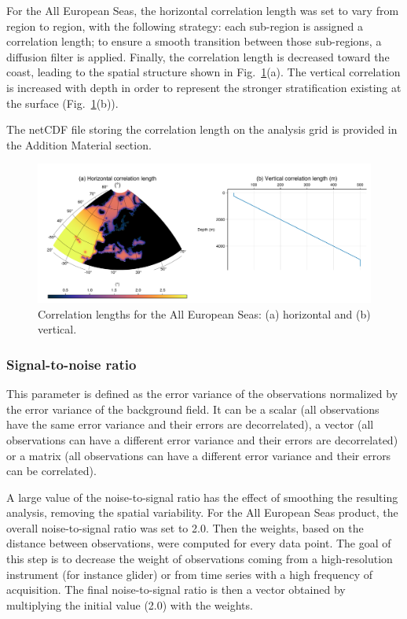 \documentclass[essd, manuscript]{copernicus}
\begin{document}
For the All European Seas, the horizontal correlation length was set to vary from region to region, with the following strategy: each sub-region is assigned a correlation length; to ensure a smooth transition between those sub-regions, a diffusion filter is applied. Finally, the correlation length is decreased toward the coast, leading to the spatial structure shown in Fig.~\ref{fig:correlation_length}(a). The vertical correlation is increased with depth in order to represent the stronger stratification existing at the surface (Fig.~\ref{fig:correlation_length}(b)).

The netCDF file storing the correlation length on the analysis grid is provided in the Addition Material section.

\begin{figure}[t]
\centering
\includegraphics[width=\textwidth]{correlation_length.pdf}
\caption{Correlation lengths for the All European Seas: (a) horizontal and (b) vertical.\label{fig:correlation_length}}
\end{figure}

\subsubsection{Signal-to-noise ratio}

This parameter is defined as the error variance of the observations normalized by the error variance of the background field. It can be a scalar (all observations have the same error variance and their errors are decorrelated), a vector (all observations can have a different error variance and their errors are decorrelated) or a matrix (all observations can have a different error variance and their errors can be correlated). 

A large value of the noise-to-signal ratio has the effect of smoothing the resulting analysis, removing the spatial variability. For the All European Seas product, the overall noise-to-signal ratio was set to 2.0. Then the weights, based on the distance between observations, were computed for every data point. The goal of this step is to decrease the weight of observations coming from a high-resolution instrument (for instance glider) or from time series with a high frequency of acquisition. The final noise-to-signal ratio is then a vector obtained by multiplying the initial value (2.0) with the weights.
\end{document}
